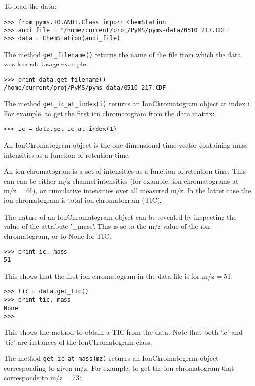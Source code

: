 To load the data:

\begin{verbatim}
>>> from pyms.IO.ANDI.Class import ChemStation
>>> andi_file = "/home/current/proj/PyMS/pyms-data/0510_217.CDF"
>>> data = ChemStation(andi_file)
\end{verbatim}

The method {\tt get\_filename()} returns the name of the file from which
the data was loaded. Usage example:

\begin{verbatim}
>>> print data.get_filename()
/home/current/proj/PyMS/pyms-data/0510_217.CDF
\end{verbatim}

The method {\tt get\_ic\_at\_index(i)} returns an IonChromatogram object
at index i. For example, to get the first ion chromatogram from the data
matrix:

\begin{verbatim}
>>> ic = data.get_ic_at_index(1)
\end{verbatim}

\noindent
An IonChromatogram object is the one dimensional time vector containing
mass intensities as a function of retention time.

An ion chromatogram is a set of intensities as a function of retention
time. This can can be either m/z channel intensities (for example, ion
chromatograms at m/z = 65), or cumulative intensities over all measured
m/z. In the latter case the ion chromatogram is total ion chromatogram
(TIC).

The nature of an IonChromatogram object can be revealed by inspecting
the value of the attribute '\_mass'. This is se to the m/z value of
the ion chromatogram, or to None for TIC.

\begin{verbatim}
>>> print ic._mass
51
\end{verbatim}

\noindent
This shows that the first ion chromatogram in the data file is for
m/z = 51.

\begin{verbatim}
>>> tic = data.get_tic()
>>> print tic._mass
None
>>>
\end{verbatim}

\noindent
This shows the method to obtain a TIC from the data. Note that both
'ic' and 'tic' are instances of the IonChromatogram class.

The method {\tt get\_ic\_at\_mass(mz)} returns an IonChromatogram
object corresponding to given m/z. For example, to get the ion
chromatogram that corresponds to m/z = 73:

